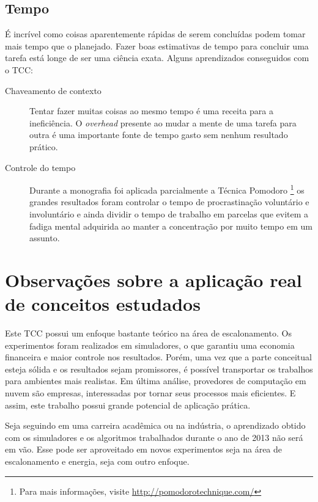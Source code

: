 
\subsection{Tempo} %
\label{sub:tempo}

É incrível como coisas aparentemente rápidas de serem concluídas podem tomar
mais tempo que o planejado. Fazer boas estimativas de tempo para concluir uma
tarefa está longe de ser uma ciência exata. Alguns aprendizados conseguidos com
o TCC:

\begin{description}
	\item[Chaveamento de contexto] Tentar fazer muitas coisas ao mesmo tempo é
		uma receita para a ineficiência. O \emph{overhead} presente ao mudar
		a mente de uma tarefa para outra é uma importante fonte de tempo gasto
		sem nenhum resultado prático.
	\item[Controle do tempo] Durante a monografia foi aplicada parcialmente a
		Técnica Pomodoro \footnote{Para mais informações,
		visite \url{http://pomodorotechnique.com/}} os grandes resultados foram
		controlar o tempo de procrastinação voluntário e involuntário e ainda
		dividir o tempo de trabalho em parcelas que evitem a fadiga mental
		adquirida ao manter a concentração por muito tempo em um assunto.
\end{description}


\section{Observações sobre a aplicação real de conceitos estudados}
\label{sec:observacoes_sobre_aplicacao_real}

Este TCC possui um enfoque bastante teórico na área de escalonamento. Os
experimentos foram realizados em simuladores, o que garantiu uma economia
financeira e maior controle nos resultados. Porém, uma vez que a parte
conceitual esteja sólida e os resultados sejam promissores, é possível
transportar os trabalhos para ambientes mais realistas. Em última análise,
provedores de computação em nuvem  são empresas, interessadas por tornar seus
processos mais eficientes. E assim, este trabalho possui grande potencial de
aplicação prática.

Seja seguindo em uma carreira acadêmica ou na indústria, o aprendizado obtido
com os simuladores e os algoritmos trabalhados durante o ano de 2013 não será
em vão. Esse pode ser aproveitado em novos experimentos seja na área de
escalonamento e energia, seja com outro enfoque.

